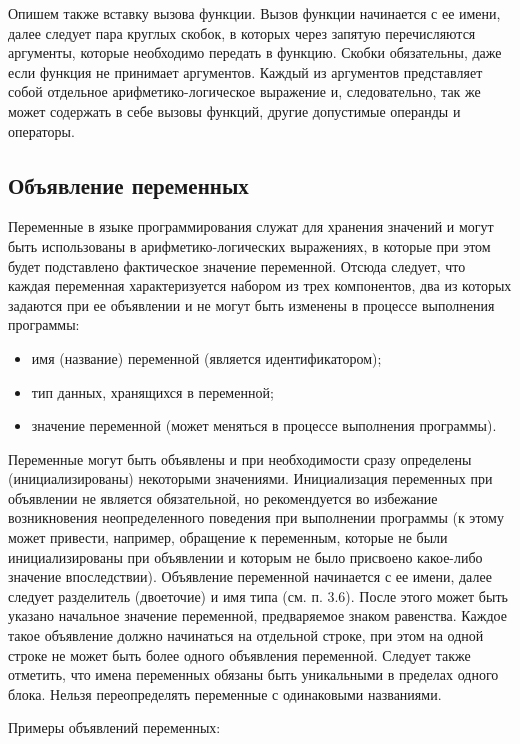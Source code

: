 Опишем также вставку вызова функции. Вызов функции начинается с ее имени, далее следует пара круглых скобок, в которых через запятую перечисляются аргументы, которые необходимо передать в функцию. Скобки обязательны, даже если функция не принимает аргументов. Каждый из аргументов представляет собой отдельное арифметико-логическое выражение и, следовательно, так же может содержать в себе вызовы функций, другие допустимые операнды и операторы.

\subsection{Объявление переменных}

Переменные в языке программирования служат для хранения значений и могут быть использованы в арифметико-логических выражениях, в которые при этом будет подставлено фактическое значение переменной. Отсюда следует, что каждая переменная характеризуется набором из трех компонентов, два из которых задаются при ее объявлении и не могут быть изменены в процессе выполнения программы:

\begin{itemize}
    \item имя (название) переменной (является идентификатором);
    \item тип данных, хранящихся в переменной;
    \item значение переменной (может меняться в процессе выполнения программы).
\end{itemize}

Переменные могут быть объявлены и при необходимости сразу определены (инициализированы) некоторыми значениями. Инициализация переменных при объявлении не является обязательной, но рекомендуется во избежание возникновения неопределенного поведения при выполнении программы (к этому может привести, например, обращение к переменным, которые не были инициализированы при объявлении и которым не было присвоено какое-либо значение впоследствии).
Объявление переменной начинается с ее имени, далее следует разделитель (двоеточие) и имя типа (см. п. 3.6). После этого может быть указано начальное значение переменной, предваряемое знаком равенства. Каждое такое объявление должно начинаться на отдельной строке, при этом на одной строке не может быть более одного объявления переменной. Следует также отметить, что имена переменных обязаны быть уникальными в пределах одного блока. Нельзя переопределять переменные с одинаковыми названиями.

Примеры объявлений переменных:

